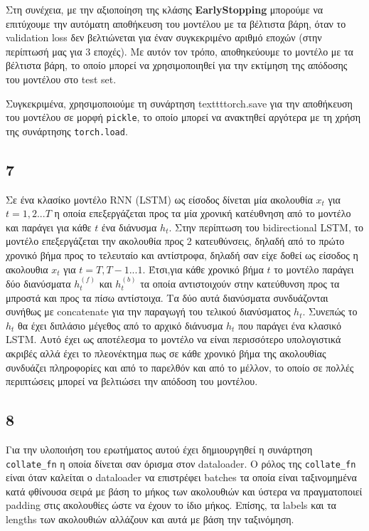 \documentclass[a4paper,12pt]{article}
\begin{document}
Στη συνέχεια, με την αξιοποίηση της κλάσης \textbf{EarlyStopping} μπορούμε να επιτύχουμε την αυτόματη
αποθήκευση του μοντέλου με τα βέλτιστα βάρη, όταν το validation loss δεν βελτιώνεται για έναν
συγκεκριμένο αριθμό εποχών (στην περίπτωσή μας για $3$ εποχές). Με αυτόν τον τρόπο, αποθηκεύουμε
το μοντέλο με τα βέλτιστα βάρη, το οποίο μπορεί να χρησιμοποιηθεί για την εκτίμηση της απόδοσης
του μοντέλου στο test set.

Συγκεκριμένα, χρησιμοποιούμε τη συνάρτηση texttt{torch.save} για την αποθήκευση του μοντέλου
σε μορφή \texttt{pickle}, το οποίο μπορεί να ανακτηθεί αργότερα με τη χρήση της συνάρτησης
\texttt{torch.load}. 


\subsection*{7}
Σε ένα κλασίκο μοντέλο RNN (LSTM) ως είσοδος δίνεται μία ακολουθία $x_t$ για $t=1,2...T$
η οποία επεξεργάζεται προς τα μία χρονική κατέυθνηση από το μοντέλο και παράγει για κάθε $t$
ένα διάνυσμα $h_t$. Στην περίπτωση του bidirectional LSTM, το μοντέλο επεξεργάζεται την ακολουθία
προς 2 κατευθύνσεις, δηλαδή από το πρώτο χρονικό βήμα προς το τελευταίο και αντίστροφα, δηλαδή
σαν είχε δοθεί ως είσοδος η ακολουθια $x_t$ για $t=Τ,Τ-1...1$.
Έτσι,για κάθε χρονικό βήμα $t$ το μοντέλο παράγει δύο διανύσματα $h_t^{(f)}$ και $h_t^{(b)}$ τα οποία
αντιστοιχούν στην κατεύθυνση προς τα μπροστά και προς τα πίσω αντίστοιχα. Τα δύο αυτά διανύσματα
συνδυάζονται συνήθως με concatenate για την παραγωγή του τελικού διανύσματος $h_t$. Συνεπώς το
$h_t$ θα έχει διπλάσιο μέγεθος από το αρχικό διάνυσμα $h_t$ που παράγει ένα κλασικό LSTM.
Αυτό έχει ως αποτέλεσμα το μοντέλο να είναι περισσότερο υπολογιστικά ακριβές αλλά έχει το πλεονέκτημα
πως σε κάθε χρονικό βήμα της ακολουθίας συνδυάζει πληροφορίες και από το παρελθόν και από το μέλλον,
το οποίο σε πολλές περιπτώσεις μπορεί να βελτιώσει την απόδοση του μοντέλου.

\subsection*{8}
Για την υλοποιήση του ερωτήματος αυτού έχει δημιουργηθεί η συνάρτηση
\texttt{collate\_fn} η οποία δίνεται σαν όρισμα στον dataloader.
Ο ρόλος της \texttt{collate\_fn} είναι όταν καλείται ο dataloader
να επιστρέφει batches τα οποία είναι ταξινομημένα κατά φθίνουσα σειρά
με βάση το μήκος των ακολουθιών και ύστερα να πραγματοποιεί padding
στις ακολουθίες ώστε να έχουν το ίδιο μήκος. Επίσης, τα labels και
τα lengths των ακολουθιών αλλάζουν και αυτά με βάση την ταξινόμηση.
\end{document}
